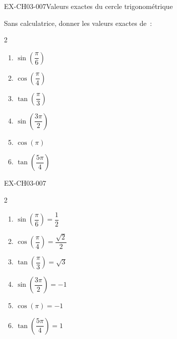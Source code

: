 
\begin{exercice}{EX-CH03-007}{Valeurs exactes du cercle trigonométrique}

Sans calculatrice, donner les valeurs exactes de~:

\begin{multicols}{2}
\begin{enumerate}[label=\alph*)]
  \item $\sin\!\left(\dfrac{\pi}{6}\right)$
  \item $\cos\!\left(\dfrac{\pi}{4}\right)$
  \item $\tan\!\left(\dfrac{\pi}{3}\right)$
  \item $\sin\!\left(\dfrac{3\pi}{2}\right)$
  \item $\cos(\pi)$
  \item $\tan\!\left(\dfrac{5\pi}{4}\right)$
\end{enumerate}
\end{multicols}

\end{exercice}

\begin{solution}{EX-CH03-007}

\begin{multicols}{2}
\begin{enumerate}[label=\alph*)]
  \item $\sin\!\left(\dfrac{\pi}{6}\right) = \dfrac{1}{2}$
  \item $\cos\!\left(\dfrac{\pi}{4}\right) = \dfrac{\sqrt{2}}{2}$
  \item $\tan\!\left(\dfrac{\pi}{3}\right) = \sqrt{3}$
  \item $\sin\!\left(\dfrac{3\pi}{2}\right) = -1$
  \item $\cos(\pi) = -1$
  \item $\tan\!\left(\dfrac{5\pi}{4}\right) = 1$
\end{enumerate}
\end{multicols}

\end{solution}
